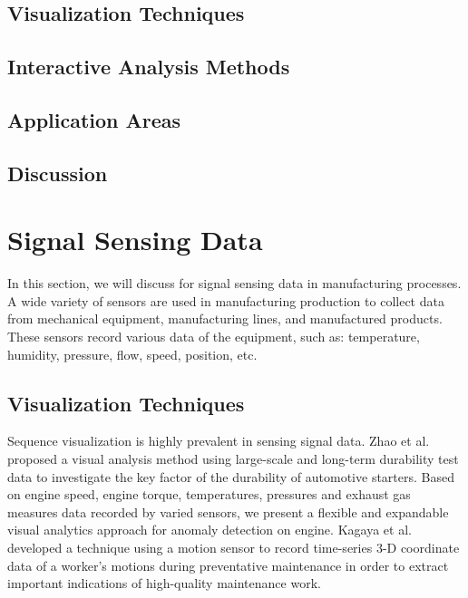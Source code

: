 \documentclass[a4paper,fleqn]{cas-dc}
\begin{document}
\subsection{Visualization Techniques}

\subsection{Interactive Analysis Methods}

\subsection{Application Areas}

\subsection{Discussion}

\section{Signal Sensing Data}
In this section, we will discuss for signal sensing data in manufacturing processes.
A wide variety of sensors are used in manufacturing production to collect data from mechanical equipment, manufacturing lines, and manufactured products.
These sensors record various data of the equipment, such as: temperature, humidity, pressure, flow, speed, position, etc.

\subsection{Visualization Techniques}
Sequence visualization is highly prevalent in sensing signal data.
Zhao et al. \cite{zhao2019visual} proposed a visual analysis method using large-scale and long-term durability test data to  investigate the key factor of the durability of automotive starters.
Based on engine speed, engine torque, temperatures, pressures and exhaust gas measures data recorded by varied sensors, we present a flexible and expandable visual analytics approach for anomaly detection on engine.
Kagaya et al. \cite{Kagaya2017} developed a technique using a motion sensor to record time-series 3-D coordinate data of a worker's motions during preventative maintenance in order to extract important indications of high-quality maintenance work.
\end{document}
